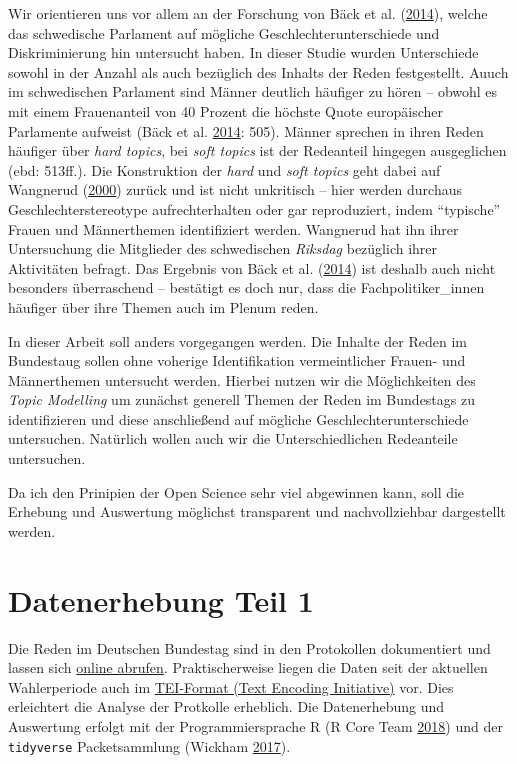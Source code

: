 \documentclass[oneside, 12pt]{scrbook}
\theoremstyle{definition}
\theoremstyle{definition}
\theoremstyle{definition}
\theoremstyle{remark}
\begin{document}
Wir orientieren uns vor allem an der Forschung von Bäck et al.
(\protect\hyperlink{ref-back_2014}{2014}), welche das schwedische
Parlament auf mögliche Geschlechterunterschiede und Diskriminierung hin
untersucht haben. In dieser Studie wurden Unterschiede sowohl in der
Anzahl als auch bezüglich des Inhalts der Reden festgestellt. Auuch im
schwedischen Parlament sind Männer deutlich häufiger zu hören -- obwohl
es mit einem Frauenanteil von 40 Prozent die höchste Quote europäischer
Parlamente aufweist (Bäck et al.
\protect\hyperlink{ref-back_2014}{2014}: 505). Männer sprechen in ihren
Reden häufiger über \emph{hard topics}, bei \emph{soft topics} ist der
Redeanteil hingegen ausgeglichen (ebd: 513ff.). Die Konstruktion der
\emph{hard} und \emph{soft topics} geht dabei auf Wangnerud
(\protect\hyperlink{ref-wangnerud_2000}{2000}) zurück und ist nicht
unkritisch -- hier werden durchaus Geschlechterstereotype
aufrechterhalten oder gar reproduziert, indem ``typische'' Frauen und
Männerthemen identifiziert werden. Wangnerud hat ihn ihrer Untersuchung
die Mitglieder des schwedischen \emph{Riksdag} bezüglich ihrer
Aktivitäten befragt. Das Ergebnis von Bäck et al.
(\protect\hyperlink{ref-back_2014}{2014}) ist deshalb auch nicht
besonders überraschend -- bestätigt es doch nur, dass die
Fachpolitiker\_innen häufiger über ihre Themen auch im Plenum reden.

In dieser Arbeit soll anders vorgegangen werden. Die Inhalte der Reden
im Bundestaug sollen ohne voherige Identifikation vermeintlicher Frauen-
und Männerthemen untersucht werden. Hierbei nutzen wir die Möglichkeiten
des \emph{Topic Modelling} um zunächst generell Themen der Reden im
Bundestags zu identifizieren und diese anschließend auf mögliche
Geschlechterunterschiede untersuchen. Natürlich wollen auch wir die
Unterschiedlichen Redeanteile untersuchen.

Da ich den Prinipien der Open Science sehr viel abgewinnen kann, soll
die Erhebung und Auswertung möglichst transparent und nachvollziehbar
dargestellt werden.

\hypertarget{data-01}{%
\chapter{Datenerhebung Teil 1}\label{data-01}}

Die Reden im Deutschen Bundestag sind in den Protokollen dokumentiert
und lassen sich \href{https://www.bundestag.de/protokolle}{online
abrufen}. Praktischerweise liegen die Daten seit der aktuellen
Wahlerperiode auch im \href{http://www.tei-c.org/}{TEI-Format (Text
Encoding Initiative)} vor. Dies erleichtert die Analyse der Protkolle
erheblich. Die Datenerhebung und Auswertung erfolgt mit der
Programmiersprache R (R Core Team
\protect\hyperlink{ref-rcoreteam_2018}{2018}) und der \texttt{tidyverse}
Packetsammlung (Wickham \protect\hyperlink{ref-wickham_2017}{2017}).
\end{document}

